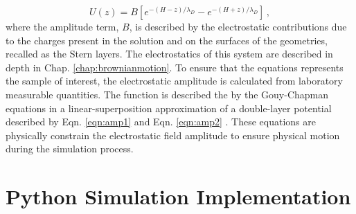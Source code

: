 \begin{equation}\label{eqn:67}
    U(z) = B\left[e^{-(H - z)/\lambda_D} - e^{-(H + z)/\lambda_D}\right]\,,
\end{equation}
where the amplitude term, $B$, is described by the electrostatic contributions due to the charges present in the solution and on the surfaces of the geometries, recalled as the Stern layers. The electrostatics of this system are described in depth in Chap. \ref{chap:brownianmotion}. To ensure that the equations represents the sample of interest, the electrostatic amplitude is calculated from laboratory measurable quantities. The function is described the by the Gouy-Chapman equations in a linear-superposition approximation of a double-layer potential described by Eqn. \ref{eqn:amp1} and Eqn. \ref{eqn:amp2} \cite{lin_exact_2010, israelachviliIntermolecularSurfaceForces}. These equations are physically constrain the electrostatic field amplitude to ensure physical motion during the simulation process. 



\section{Python Simulation Implementation}

